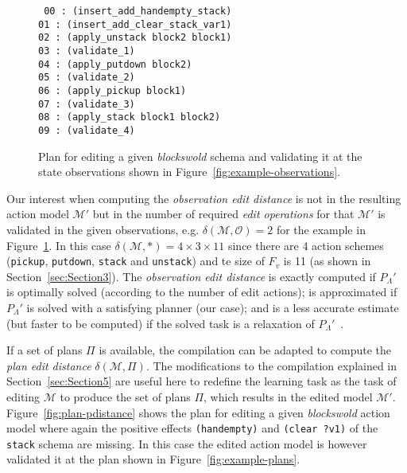 \documentclass[3p,times]{elsarticle}
\begin{document}
\begin{figure}[hbt!]
{\tt\small
00 : (insert\_add\_handempty\_stack)\\
01 : (insert\_add\_clear\_stack\_var1)\\
02 : (apply\_unstack block2 block1)\\
03 : (validate\_1)\\
04 : (apply\_putdown block2)\\
05 : (validate\_2)\\
06 : (apply\_pickup block1)\\
07 : (validate\_3)\\
08 : (apply\_stack block1 block2)\\
09 : (validate\_4)\\
}
 \caption{\small Plan for editing a given {\em blockswold} schema and validating it at the state observations shown in Figure~\ref{fig:example-observations}.}
\label{fig:plan-odistance}
\end{figure}

Our interest when computing the {\em observation edit distance} is not in the resulting action model $\mathcal{M}'$ but in the number of required {\em edit operations} for that $\mathcal{M}'$ is validated in the given observations, e.g. $\delta(\mathcal{M},\mathcal{O})=2$ for the example in Figure~\ref{fig:plan-odistance}. In this case $\delta(\mathcal{M},*)=4\times 3\times 11$ since there are 4 action schemes ({\small\tt pickup}, {\small\tt putdown}, {\small\tt stack} and {\small\tt unstack}) and te size of $F_v$ is 11 (as shown in Section~\ref{sec:Section3}). The {\em observation edit distance} is exactly computed if $P_{\Lambda}'$ is optimally solved (according to the number of edit actions); is approximated if $P_{\Lambda}'$ is solved with a satisfying planner (our case); and is a less accurate estimate (but faster to be computed) if the solved task is a relaxation of $P_{\Lambda}'$~\cite{bonet2001planning}.

If a set of plans $\Pi$ is available, the compilation can be adapted to compute the {\em plan edit distance} $\delta(\mathcal{M},\Pi)$. The modifications to the compilation explained in  Section~\ref{sec:Section5} are useful here to redefine the learning task as the task of editing $\mathcal{M}$ to produce the set of plans $\Pi$, which results in the edited model $\mathcal{M}'$. Figure~\ref{fig:plan-pdistance} shows the plan for editing a given {\em blockswold} action model where again the positive effects {\tt\small (handempty)} and {\tt\small (clear ?v1)} of the {\tt\small stack} schema are missing. In this case the edited action model is however validated it at the plan shown in Figure~\ref{fig:example-plans}.
\end{document}
